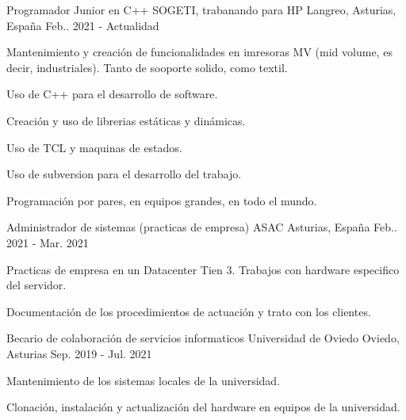 

\begin{cventries}

  \cventry
    {Programador Junior en C++} %
    {SOGETI, trabanando para HP} %
    {Langreo, Asturias, España} %
    {Feb.. 2021 - Actualidad} %
    {
      \begin{cvitems} %
        \item {Mantenimiento y creación de funcionalidades en imresoras MV (mid volume, es decir, industriales).
            Tanto de sooporte solido, como textil.}
        \item {Uso de C++ para el desarrollo de software.}
        \item {Creación y uso de librerias estáticas y dinámicas.}
        \item {Uso de TCL y maquinas de estados.}
        \item {Uso de subversion para el desarrollo del trabajo.}
        \item {Programación por pares, en equipos grandes, en todo el mundo.}
      \end{cvitems}
    }

  \cventry
    {Administrador de sistemas (practicas de empresa)} %
    {ASAC} %
    {Asturias, España} %
    {Feb.. 2021 - Mar. 2021} %
    {
      \begin{cvitems} %
        \item {Practicas de empresa en un Datacenter Tien 3. Trabajos con hardware especifico del servidor.}
        \item {Documentación de los procedimientos de actuación y trato con los clientes.}
      \end{cvitems}
    }

  \cventry
    {Becario de colaboración de servicios informaticos} %
    {Universidad de Oviedo} %
    {Oviedo, Asturias} %
    {Sep. 2019 - Jul. 2021} %
    {
      \begin{cvitems} %
        \item {Mantenimiento de los sistemas locales de la universidad.}
        \item {Clonación, instalación y actualización del hardware en equipos de la universidad.}
      \end{cvitems}
    }

\end{cventries}
